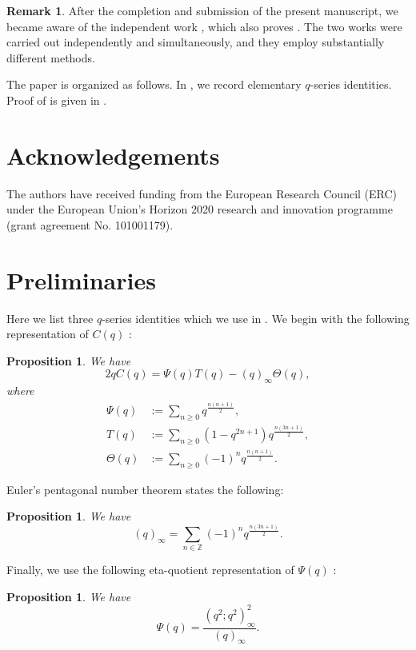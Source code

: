 \documentclass[12pt,reqno]{amsart}
\renewcommand{\(}{\left\(}
\renewcommand{\)}{\right\)}
\numberwithin{equation}{section}
\theoremstyle{plain}
\newtheorem{proposition}[theorem]{Proposition}
\theoremstyle{definition}
\newtheorem*{remark}{Remark}
\numberwithin{equation}{section}
\begin{document}

\begin{remark}
After the completion and submission of the present manuscript, we became aware of the independent work \cite{LX}, which also proves . The two works were carried out independently and simultaneously, and they employ substantially different methods.
\end{remark}


 The paper is organized as follows. In , we record elementary $q$-series identities. Proof of  is given in . %

\section*{Acknowledgements}
The authors have received funding from the European Research Council (ERC) under the European Union's Horizon 2020 research and innovation programme (grant agreement No. 101001179).

\section{Preliminaries}\label{sec1}

Here we list three $q$-series identities which we use in . We begin with the following representation of $C(q)$ \cite[equation (4.8)]{AB}:
\begin{proposition}\label{prop0}
We have
\[
2qC(q)=\Psi(q)T(q)-(q)_{\infty}\Theta(q),
\]
where %
\begin{align}\label{def1}
\Psi(q)&:=\sum_{n\ge 0}q^{\frac{n(n+1)}{2}},\\\label{def2}
T(q)&:=\sum_{n\ge 0}\left(1-q^{2n+1}\right)q^{\frac{n(3n+1)}{2}},\\\label{def3}
\Theta(q)&:=\sum_{n\ge 0}(-1)^n q^{\frac{n(n+1)}{2}}.
\end{align}
\end{proposition}
Euler's pentagonal number theorem \cite[Corollary 1.7]{Andbook} states the following:
\begin{proposition}\label{prop1}
We have 
\[
(q)_{\infty}=\sum_{n\in \mathbb{Z}}(-1)^n q^{\frac{n(3n+1)}{2}}.
\]
\end{proposition}
Finally, we use the following eta-quotient representation of $\Psi(q)$ \cite[equation (2.2.13)]{Andbook}:
\begin{proposition}\label{prop2}
We have
\[
\Psi(q)=\frac{\left(q^2;q^2\right)^2_{\infty}}{(q)_{\infty}}.
\]
\end{proposition}
\end{document}
